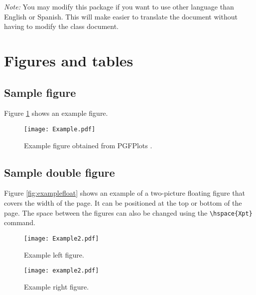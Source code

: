 \documentclass[9pt,a4paper,twoside]{rho-class/rho}
\begin{document}
        \textit{Note:} You may modify this package if you want to use other language than English or Spanish. This will make easier to translate the document without having to modify the class document.

\section{Figures and tables}

    \subsection{Sample figure}

        Figure \ref{fig:figure} shows an example figure.
        
            \begin{figure}[H]
                \centering
                \texttt{[image: Example.pdf]}
                \caption{Example figure obtained from PGFPlots \cite{PFGPlots}.}
                \label{fig:figure}
            \end{figure}

    \subsection{Sample double figure}

        Figure \ref{fig:examplefloat} shows an example of a two-picture floating figure that covers the width of the page. It can be positioned at the top or bottom of the page. The space between the figures can also be changed using the \verb|\hspace{Xpt}| command.

        \begin{figure*}[t!] %
            \centering
                \begin{subfigure}[b]{0.38\linewidth} %
                    \texttt{[image: Example2.pdf]}
                    \caption{Example left figure.}
                    \label{fig:figa}
                \end{subfigure}
            \hspace{15pt}   %
                \begin{subfigure}[b]{0.38\linewidth} %
                    \centering
                    \texttt{[image: example2.pdf]}
                    \caption{Example right figure.}
                    \label{fig:figb}
                \end{subfigure}
            \caption{Example figure that covers the width of the page obtained from PGFPlots \cite{PFGPlots}.}
            \label{fig:examplefloat}
        \end{figure*}
\end{document}
